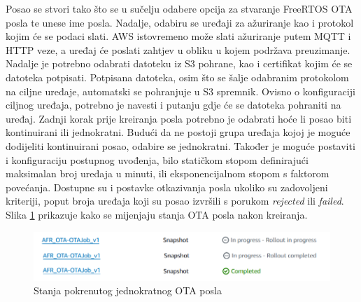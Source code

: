 Posao se stvori tako što se u sučelju odabere opcija za stvaranje FreeRTOS OTA posla te unese ime posla. Nadalje, odabiru se uređaji za ažuriranje kao i protokol kojim će se podaci slati. AWS istovremeno može slati ažuriranje putem MQTT i HTTP veze, a uređaj će poslati zahtjev u obliku u kojem podržava preuzimanje. Nadalje je potrebno odabrati datoteku iz S3 pohrane, kao i certifikat kojim će se datoteka potpisati. Potpisana datoteka, osim što se šalje odabranim protokolom na ciljne uređaje, automatski se pohranjuje u S3 spremnik. Ovisno o konfiguraciji ciljnog uređaja, potrebno je navesti i putanju gdje će se datoteka pohraniti na uređaj. Zadnji korak prije kreiranja posla potrebno je odabrati hoće li posao biti kontinuirani ili jednokratni. Budući da ne postoji grupa uređaja kojoj je moguće dodijeliti kontinuirani posao, odabire se jednokratni. Također je moguće postaviti i konfiguraciju postupnog uvođenja, bilo statičkom stopom definirajući maksimalan broj uređaja u minuti, ili eksponencijalnom stopom s faktorom povećanja. Dostupne su i postavke otkazivanja posla ukoliko su zadovoljeni kriteriji, poput broja uređaja koji su posao izvršili s porukom \textit{rejected} ili \textit{failed}. Slika \ref{fig:otajob} prikazuje kako se mijenjaju stanja OTA posla nakon kreiranja. 

\begin{figure}[ht]
	\centering
	\includegraphics[scale=0.5]{imgs/otajob}
	\caption{Stanja pokrenutog jednokratnog OTA posla}
	\label{fig:otajob}
\end{figure}
